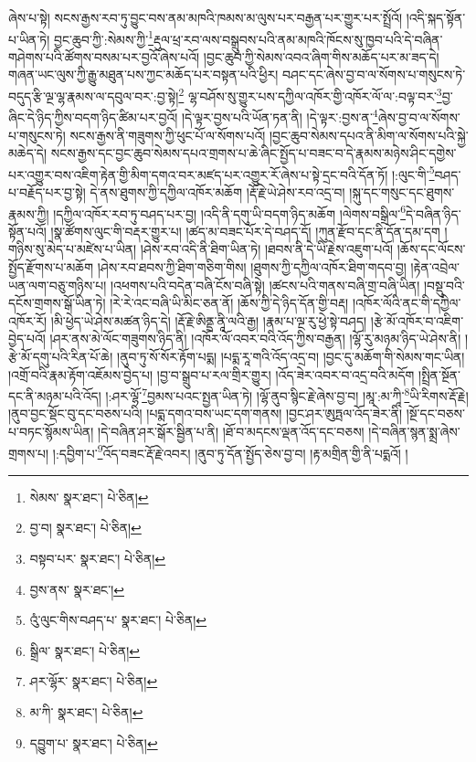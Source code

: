 ཞེས་པ་སྟེ། སངས་རྒྱས་རབ་ཏུ་བྱུང་བས་ནམ་མཁའི་ཁམས་མ་ལུས་པར་བརྒྱན་པར་གྱུར་པར་སྤྲོའོ། །འདི་སྐད་སྟོན་པ་ཡིན་ཏེ། བྱང་ཆུབ་ཀྱི་:སེམས་ཀྱི་\footnote{སེམས་  སྣར་ཐང་།  པེ་ཅིན། }རྡུལ་ཕྲ་རབ་ལས་བསྒྲུབས་པའི་ནམ་མཁའི་ཁོངས་སུ་ཁྱབ་པའི་དེ་བཞིན་གཤེགས་པའི་ཚོགས་བསམ་པར་བྱའོ་ཞེས་པའོ། །བྱང་ཆུབ་ཀྱི་སེམས་འབའ་ཞིག་གིས་མཆོད་པར་མ་ཟད་དེ། གཞན་ཡང་ལུས་ཀྱི་རྒྱུ་མཐུན་པས་ཀྱང་མཆོད་པར་བསྟན་པའི་ཕྱིར། བཤང་དང་ཞེས་བྱ་བ་ལ་སོགས་པ་གསུངས་ཏེ་བདུད་རྩི་ལྔ་ལྷ་རྣམས་ལ་དབུལ་བར་:བྱ་སྟེ།\footnote{བྱ་བ།  སྣར་ཐང་།  པེ་ཅིན། } ལྷ་བཤོས་སུ་གྱུར་པས་དཀྱིལ་འཁོར་གྱི་འཁོར་ལོ་ལ་:བལྟ་བར་\footnote{བསྟབ་པར་  སྣར་ཐང་།  པེ་ཅིན། }བྱ་ཞིང་དེ་ཉིད་ཀྱིས་བདག་ཉིད་ཚིམ་པར་བྱའོ། །དེ་ལྟར་བྱས་པའི་ཡོན་ཏན་ནི། །དེ་ལྟར་:བྱས་ན་\footnote{བྱས་ནས་  སྣར་ཐང་། }ཞེས་བྱ་བ་ལ་སོགས་པ་གསུངས་ཏེ། སངས་རྒྱས་ནི་གཟུགས་ཀྱི་ཕུང་པོ་ལ་སོགས་པའོ། །བྱང་ཆུབ་སེམས་དཔའ་ནི་མིག་ལ་སོགས་པའི་སྐྱེ་མཆེད་དེ། སངས་རྒྱས་དང་བྱང་ཆུབ་སེམས་དཔའ་གྲགས་པ་ཆེ་ཞིང་སྤྱོད་པ་བཟང་བ་དེ་རྣམས་མཉེས་ཤིང་དགྱེས་པར་འགྱུར་བས་འཇིག་རྟེན་གྱི་མིག་དགའ་བར་མཛད་པར་འགྱུར་རོ་ཞེས་པ་སྟེ་དྲང་བའི་དོན་ཏོ། །:ལུང་གི་\footnote{འུཾ་ལུང་གིས་བཤད་པ་  སྣར་ཐང་།  པེ་ཅིན། }བཤད་པ་བརྗོད་པར་བྱ་སྟེ། དེ་ནས་ཐུགས་ཀྱི་དཀྱིལ་འཁོར་མཆོག །རྡོ་རྗེ་ཡེ་ཤེས་རབ་འདྲ་བ། །སྐུ་དང་གསུང་དང་ཐུགས་རྣམས་ཀྱི། །དཀྱིལ་འཁོར་རབ་ཏུ་བཤད་པར་བྱ། །འདི་ནི་དགུ་ཡི་བདག་ཉིད་མཆོག །ལེགས་བསྒྲིལ་\footnote{སྒྲིལ་  སྣར་ཐང་།  པེ་ཅིན། }དེ་བཞིན་ཉིད་སྟོན་པའོ། །སྣ་ཚོགས་ལུང་གི་བརྡར་གྱུར་པ། །ཚད་མ་བཟང་པོར་དེ་བཤད་དོ། །ཀུན་རྫོབ་དང་ནི་དོན་དམ་དག །གཉིས་སུ་མེད་པ་མཛེས་པ་ཡིན། །ཤེས་རབ་འདི་ནི་ཐིག་ཡིན་ཏེ། །ཐབས་ནི་དེ་ཡི་རྗེས་འཇུག་པའོ། །ཆོས་དང་ལོངས་སྤྱོད་རྫོགས་པ་མཆོག །ཤེས་རབ་ཐབས་ཀྱི་ཐིག་གཅིག་གིས། །ཐུགས་ཀྱི་དཀྱིལ་འཁོར་ཐིག་གདབ་བྱ། །རྟེན་འབྲེལ་ཡན་ལག་བཅུ་གཉིས་པ། །འཕགས་པའི་བདེན་བཞི་ངོས་བཞི་སྟེ། །ཚངས་པའི་གནས་བཞི་གྲ་བཞི་ཡིན། །བསྡུ་བའི་དངོས་གྲགས་སྒོ་ཡིན་ཏེ། །རེ་རེ་འང་བཞི་ཡི་མིང་ཅན་ནོ། །ཆོས་ཀྱི་དེ་ཉིད་དོན་གྱི་བརྡ། །འཁོར་ལོའི་ནང་གི་དཀྱིལ་འཁོར་རོ། །མི་ཕྱེད་ཡེ་ཤེས་མཚན་ཉིད་དེ། །རྡོ་རྗེ་ཨིནྡྲ་ནཱི་ལའི་རྒྱ། །རྣམ་པ་ལྔ་རུ་ཕྱེ་སྟེ་བཤད། །རྩེ་མོ་འཁོར་བ་འཇིག་བྱེད་པའོ། །ཤར་ནས་མེ་ལོང་གཟུགས་ཉིད་ནི། །འཁོར་ལོ་འབར་བའི་འོད་ཀྱིས་བརྒྱན། །ལྷོ་རུ་མཉམ་ཉིད་ཡེ་ཤེས་ནི། །རྩེ་མོ་དགུ་པའི་རིན་པོ་ཆེ། །ནུབ་ཏུ་སོ་སོར་རྟོག་པདྨ། །པདྨ་རཱ་གའི་འོད་འདྲ་བ། །བྱང་དུ་མཆོག་གི་སེམས་གང་ཡིན། །འགྲོ་བའི་རྣམ་རྟོག་འཇོམས་བྱེད་པ། །བྱ་བ་སྒྲུབ་པ་རལ་གྲིར་གྱུར། །འོད་ཟེར་འབར་བ་འདྲ་བའི་མདོག །སྤྲིན་སྔོན་དང་ནི་མཉམ་པའི་འོད། །:ཤར་ལྷོ་\footnote{ཤར་ལྷོར་  སྣར་ཐང་།  པེ་ཅིན། }བྱམས་པའང་སྤྱན་ཡིན་ཏེ། །ལྷོ་ནུབ་སྙིང་རྗེ་ཞེས་བྱ་བ། །མཱ་:མ་ཀཱི་\footnote{མ་ཀི་  སྣར་ཐང་།  པེ་ཅིན། }ཡི་རིགས་རྡོ་རྗེ། །ནུབ་བྱང་སྡོང་བུ་དང་བཅས་པའི། །པདྨ་དགའ་བས་ཡང་དག་གནས། །བྱང་ཤར་ཨུཏྤལ་འོད་ཟེར་ནི། །སྔོ་དང་བཅས་པ་བཏང་སྙོམས་ཡིན། །དེ་བཞིན་ཤར་སྒོར་སྦྱིན་པ་ནི། །ཐོ་བ་མདངས་ལྡན་འོད་དང་བཅས། །དེ་བཞིན་སྙན་སྨྲ་ཞེས་གྲགས་པ། །:དབྱིག་པ་\footnote{དབྱུག་པ་  སྣར་ཐང་།  པེ་ཅིན། }འོད་བཟང་རྡོ་རྗེ་འབར། །ནུབ་ཏུ་དོན་སྤྱོད་ཅེས་བྱ་བ། །རྟ་མགྲིན་གྱི་ནི་པདྨའོ། །
